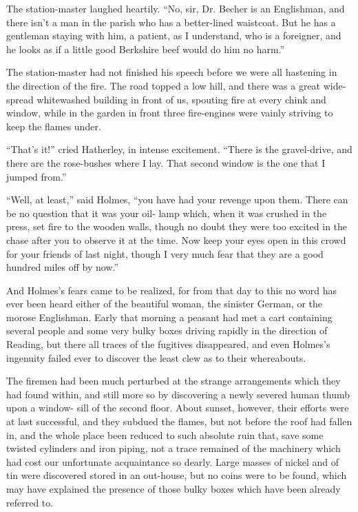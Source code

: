 The station-master laughed heartily. “No, sir, Dr. Becher
is an Englishman, and there isn’t a man in the parish who has
a better-lined waistcoat. But he has a gentleman staying with
him, a patient, as I understand, who is a foreigner, and he
looks as if a little good Berkshire beef would do him no
harm.”

The station-master had not finished his speech before we
were all hastening in the direction of the fire. The road
topped a low hill, and there was a great wide-spread whitewashed
building in front of us, spouting fire at every chink
and window, while in the garden in front three fire-engines
were vainly striving to keep the flames under.

“That’s it!” cried Hatherley, in intense excitement. “There
is the gravel-drive, and there are the rose-bushes where I lay.
That second window is the one that I jumped from.”

“Well, at least,” said Holmes, “you have had your revenge
upon them. There can be no question that it was your oil-%
lamp which, when it was crushed in the press, set fire to the
wooden walls, though no doubt they were too excited in the
chase after you to observe it at the time. Now keep your
eyes open in this crowd for your friends of last night, though
I very much fear that they are a good hundred miles off by
now.”

And Holmes’s fears came to be realized, for from that day
to this no word has ever been heard either of the beautiful
woman, the sinister German, or the morose Englishman. Early
that morning a peasant had met a cart containing several
people and some very bulky boxes driving rapidly in the direction
of Reading, but there all traces of the fugitives disappeared,
and even Holmes’s ingenuity failed ever to discover
the least clew as to their whereabouts.

The firemen had been much perturbed at the strange arrangements
which they had found within, and still more so
by discovering a newly severed human thumb upon a window-%
sill of the second floor. About sunset, however, their efforts
were at last successful, and they subdued the flames, but not
before the roof had fallen in, and the whole place been reduced
to such absolute ruin that, save some twisted cylinders and
iron piping, not a trace remained of the machinery which had
cost our unfortunate acquaintance so dearly. Large masses
of nickel and of tin were discovered stored in an out-house,
but no coins were to be found, which may have explained the
presence of those bulky boxes which have been already referred
to.

